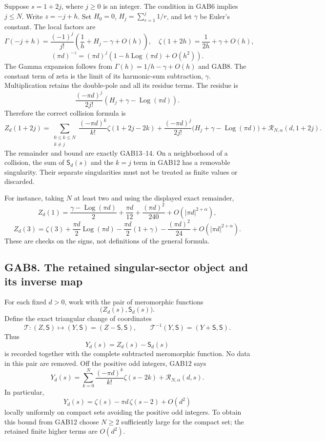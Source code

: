 \documentclass[
  10pt,
  a4paper,
]{article}
\newcommand{\Log}{\operatorname{Log}}
\begin{document}
Suppose \(s=1+2j\), where \(j\ge0\) is an integer. The condition in GAB6
implies \(j\le N\). Write \(z=-j+h\). Set \(H_0=0\),
\(H_j=\sum_{r=1}^{j}1/r\), and let \(\gamma\) be Euler's constant. The
local factors are \[
 \Gamma(-j+h)=\frac{(-1)^j}{j!}
       \left(\frac1h+H_j-\gamma+O(h)\right),
\quad
 \zeta(1+2h)=\frac1{2h}+\gamma+O(h),
\] \[
 (\pi d)^{-z}=(\pi d)^j
       \left(1-h\Log(\pi d)+O(h^2)\right).
\] The Gamma expansion follows from \(\Gamma(h)=1/h-\gamma+O(h)\) and
GAB8. The constant term of zeta is the limit of its harmonic-sum
subtraction, \(\gamma\). Multiplication retains the double-pole and all
its residue terms. The residue is \[
 \frac{(-\pi d)^j}{2j!}
              \left(H_j+\gamma-\Log(\pi d)\right).
                                                        \tag{GAB15}
\] Therefore the correct collision formula is \[
 \boxed{\displaystyle
 Z_d(1+2j)=
 \sum_{\substack{0\le k\le N\\k\ne j}}
      \frac{(-\pi d)^k}{k!}\zeta(1+2j-2k)
 +\frac{(-\pi d)^j}{2j!}
      \bigl(H_j+\gamma-\Log(\pi d)\bigr)
 +\mathcal R_{N,\alpha}(d,1+2j).}              \tag{GAB16}
\] The remainder and bound are exactly GAB13--14. On a neighborhood of a
collision, the sum of \(\mathsf S_d(s)\) and the \(k=j\) term in GAB12
has a removable singularity. Their separate singularities must not be
treated as finite values or discarded.

For instance, taking \(N\) at least two and using the displayed exact
remainder, \[
 Z_d(1)=\frac{\gamma-\Log(\pi d)}2
          +\frac{\pi d}{12}
          +\frac{(\pi d)^2}{240}
          +O(|\pi d|^{2+\alpha}),
\] \[
 Z_d(3)=\zeta(3)
       +\frac{\pi d}{2}\Log(\pi d)
       -\frac{\pi d}{2}(1+\gamma)
       -\frac{(\pi d)^2}{24}
       +O(|\pi d|^{2+\alpha}).                         \tag{GAB17}
\] These are checks on the signs, not definitions of the general
formula.

\subsection{GAB8. The retained singular-sector object and its inverse
map}\label{gab8.-the-retained-singular-sector-object-and-its-inverse-map}

For each fixed \(d>0\), work with the pair of meromorphic functions \[
 \bigl(Z_d(s),\mathsf S_d(s)\bigr).
\] Define the exact triangular change of coordinates \[
 \mathcal T:(Z,\mathsf S)\longmapsto(Y,\mathsf S)
                      =(Z-\mathsf S,\mathsf S),
 \qquad
 \mathcal T^{-1}(Y,\mathsf S)=(Y+\mathsf S,\mathsf S).
                                                        \tag{GAB18}
\] Thus \[
 Y_d(s)=Z_d(s)-\mathsf S_d(s)
\] is recorded together with the complete subtracted meromorphic
function. No data in this pair are removed. Off the positive odd
integers, GAB12 says \[
 Y_d(s)=\sum_{k=0}^{N}
           \frac{(-\pi d)^k}{k!}\zeta(s-2k)
           +\mathcal R_{N,\alpha}(d,s).                 \tag{GAB19}
\] In particular, \[
 Y_d(s)=\zeta(s)-\pi d\,\zeta(s-2)+O(d^2)               \tag{GAB20}
\] locally uniformly on compact sets avoiding the positive odd integers.
To obtain this bound from GAB12 choose \(N\ge2\) sufficiently large for
the compact set; the retained finite higher terms are \(O(d^2)\).
\end{document}
